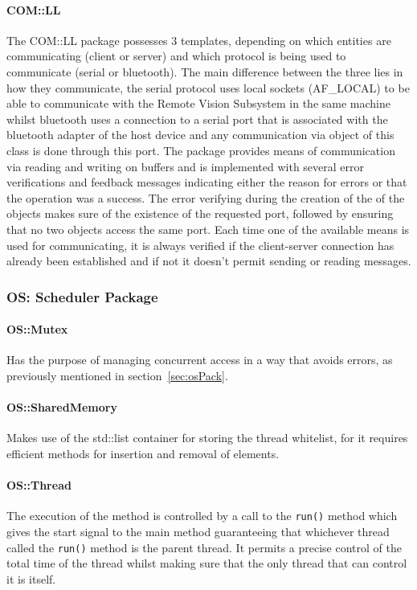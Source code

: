 \paragraph{COM::LL}
The COM::LL package possesses 3 templates, depending on which entities are communicating (client or server) and which protocol is being used to communicate (serial or bluetooth). The main difference between the three lies in how they communicate, the serial protocol uses local sockets (AF\_LOCAL) to be able to communicate with the Remote Vision Subsystem in the same machine whilst bluetooth uses a connection to a serial port that is associated with the bluetooth adapter of the host device and any communication via object of this class is done through this port.
The package provides means of communication via reading and writing on buffers and is implemented with several error verifications and feedback messages indicating either the reason for errors or that the operation was a success. The error verifying during the creation of the of the objects makes sure of the existence of the requested port, followed by ensuring that no two objects access the same port. Each time one of the available means is used for communicating, it is always verified if the client-server connection has already been established and if not it doesn't permit sending or reading messages.

%

%

%
\subsubsection{OS: Scheduler Package}
\paragraph{OS::Mutex}
Has the purpose of managing concurrent access in a way that avoids errors, as previously mentioned in section~\ref{sec:osPack}.
\paragraph{OS::SharedMemory}
Makes use of the std::list container for storing the thread whitelist, for it requires efficient methods for insertion and removal of elements.
\paragraph{OS::Thread}
The execution of the method is controlled by a call to the \texttt{run()} method which gives the start signal to the main method guaranteeing that whichever thread called the \texttt{run()} method is the parent thread. It permits a precise control of the total time of the thread whilst making sure that the only thread that can control it is itself.
%
